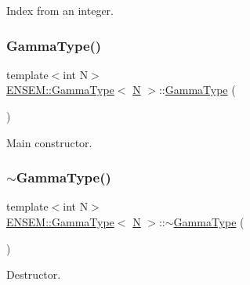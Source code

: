 Index from an integer. 

\mbox{\label{classENSEM_1_1GammaType_a40badc5d1ed98704d66277e171adb121}} 
\subsubsection{\texorpdfstring{GammaType()}{GammaType()}\hspace{0.1cm}{\footnotesize\ttfamily [3/4]}}
{\footnotesize\ttfamily template$<$int N$>$ \\
\mbox{\hyperlink{classENSEM_1_1GammaType}{E\+N\+S\+E\+M\+::\+Gamma\+Type}}$<$ \mbox{\hyperlink{operator__name__util_8cc_a7722c8ecbb62d99aee7ce68b1752f337}{N}} $>$\+::\mbox{\hyperlink{classENSEM_1_1GammaType}{Gamma\+Type}} (\begin{DoxyParamCaption}{ }\end{DoxyParamCaption})\hspace{0.3cm}{\ttfamily [inline]}}



Main constructor. 

\mbox{\label{classENSEM_1_1GammaType_a2cc80e9a9f044b1b9b344f3419718a5e}} 
\subsubsection{\texorpdfstring{$\sim$GammaType()}{~GammaType()}\hspace{0.1cm}{\footnotesize\ttfamily [2/2]}}
{\footnotesize\ttfamily template$<$int N$>$ \\
\mbox{\hyperlink{classENSEM_1_1GammaType}{E\+N\+S\+E\+M\+::\+Gamma\+Type}}$<$ \mbox{\hyperlink{operator__name__util_8cc_a7722c8ecbb62d99aee7ce68b1752f337}{N}} $>$\+::$\sim$\mbox{\hyperlink{classENSEM_1_1GammaType}{Gamma\+Type}} (\begin{DoxyParamCaption}{ }\end{DoxyParamCaption})\hspace{0.3cm}{\ttfamily [inline]}}



Destructor. 


